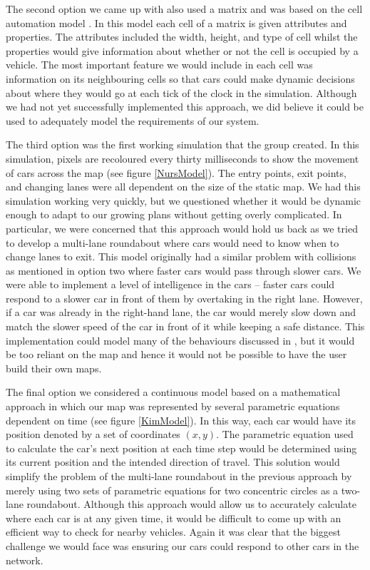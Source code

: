 \documentclass{article}
\begin{document}
	The second option we came up with also used a matrix and was based on the cell automation model \cite{namekawa2005general}. In this model each cell of a matrix is given attributes and properties. The attributes included the width, height, and type of cell whilst the properties would give information about whether or not the cell is occupied by a vehicle. The most important feature we would include in each cell was information on its neighbouring cells so that cars could make dynamic decisions about where they would go at each tick of the clock in the simulation. Although we had not yet successfully implemented this approach, we did believe it could be used to adequately model the requirements of our system. 
	
	The third option was the first working simulation that the group created. In this simulation, pixels are recoloured every thirty milliseconds to show the movement of cars across the map ({see figure \ref{NursModel}}). The entry points, exit points, and changing lanes were all dependent on the size of the static map. We had this simulation working very quickly, but we questioned whether it would be dynamic enough to adapt to our growing plans without getting overly complicated. In particular, we were concerned that this approach would hold us back as we tried to develop a multi-lane roundabout where cars would need to know when to change lanes to exit. This model originally had a similar problem with collisions as mentioned in option two where faster cars would pass through slower cars. We were able to implement a level of intelligence in the cars -- faster cars could respond to a slower car in front of them by overtaking in the right lane. However, if a car was already in the right-hand lane, the car would merely slow down and match the slower speed of the car in front of it while keeping a safe distance. This implementation could model many of the behaviours discussed in \cite{ehlert2001microscopic}, but it would be too reliant on the map and hence it would not be possible to have the user build their own maps. 
	
	The final option we considered a continuous model based on a mathematical approach in which our map was represented by several parametric equations dependent on time ({see figure \ref{KimModel}}). In this way, each car would have its position denoted by a set of coordinates $(x,y)$. The parametric equation used to calculate the car's next position at each time step would be determined using its current position and the intended direction of travel. This solution would simplify the problem of the  multi-lane roundabout in the previous approach by merely using two sets of parametric equations for two concentric circles as a two-lane roundabout. Although this approach would allow us to accurately calculate where each car is at any given time, it would be difficult to come up with an efficient way to check for nearby vehicles. Again it was clear that the biggest challenge we would face was ensuring our cars could respond to other cars in the network. 
	
\end{document}
